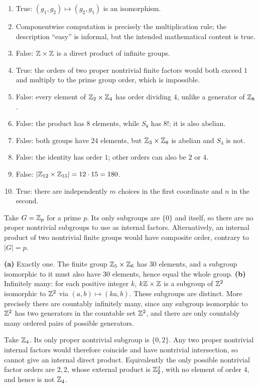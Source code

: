 \begin{enumerate}[label=(\alph*)]
\item True: $(g_1,g_2)\mapsto(g_2,g_1)$ is an isomorphism.
\item Componentwise computation is precisely the multiplication rule; the description ``easy'' is informal, but the intended mathematical content is true.
\item False: $\mathbb{Z}\times\mathbb{Z}$ is a direct product of infinite groups.
\item True: the orders of two proper nontrivial finite factors would both exceed $1$ and multiply to the prime group order, which is impossible.
\item False: every element of $\mathbb{Z}_2\times\mathbb{Z}_4$ has order dividing $4$, unlike a generator of $\mathbb{Z}_8$.
\item False: the product has $8$ elements, while $S_8$ has $8!$; it is also abelian.
\item False: both groups have $24$ elements, but $\mathbb{Z}_3\times\mathbb{Z}_8$ is abelian and $S_4$ is not.
\item False: the identity has order $1$; other orders can also be $2$ or $4$.
\item False: $|\mathbb{Z}_{12}\times\mathbb{Z}_{15}|=12\cdot15=180$.
\item True: there are independently $m$ choices in the first coordinate and $n$ in the second.
\end{enumerate}

Take $G=\mathbb{Z}_p$ for a prime $p$. Its only subgroups are $\{0\}$ and itself, so there are no proper nontrivial subgroups to use as internal factors. Alternatively, an internal product of two nontrivial finite groups would have composite order, contrary to $|G|=p$.

\textbf{(a)} Exactly one. The finite group $\mathbb{Z}_5\times\mathbb{Z}_6$ has $30$ elements, and a subgroup isomorphic to it must also have $30$ elements, hence equal the whole group.
\textbf{(b)} Infinitely many: for each positive integer $k$, $k\mathbb{Z}\times\mathbb{Z}$ is a subgroup of $\mathbb{Z}^2$ isomorphic to $\mathbb{Z}^2$ via $(a,b)\mapsto(ka,b)$. These subgroups are distinct. More precisely there are countably infinitely many, since any subgroup isomorphic to $\mathbb{Z}^2$ has two generators in the countable set $\mathbb{Z}^2$, and there are only countably many ordered pairs of possible generators.

Take $\mathbb{Z}_4$. Its only proper nontrivial subgroup is $\{0,2\}$. Any two proper nontrivial internal factors would therefore coincide and have nontrivial intersection, so cannot give an internal direct product. Equivalently the only possible nontrivial factor orders are $2,2$, whose external product is $\mathbb{Z}_2^2$, with no element of order $4$, and hence is not $\mathbb{Z}_4$.


